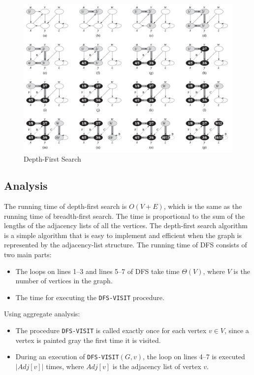 \begin{figure}[H]
    \centering
    \includegraphics[width=\textwidth]{assets/dfs.png}
    \caption{Depth-First Search}
    \label{fig:dfs}
\end{figure}

\subsection*{Analysis}

The running time of depth-first search is $O(V + E)$, which is the same as the running time of breadth-first search. The time is proportional to the sum of the lengths of the adjacency lists of all the vertices. The depth-first search algorithm is a simple algorithm that is easy to implement and efficient when the graph is represented by the adjacency-list structure.
The running time of DFS consists of two main parts:
\begin{itemize}
    \item The loops on lines 1--3 and lines 5--7 of DFS take time $\Theta(V)$, where $V$ is the number of vertices in the graph.
    \item The time for executing the \texttt{DFS-VISIT} procedure.
\end{itemize}

Using aggregate analysis:
\begin{itemize}
    \item The procedure \texttt{DFS-VISIT} is called exactly once for each vertex $v \in V$, since a vertex is painted gray the first time it is visited.
    \item During an execution of \texttt{DFS-VISIT}$(G, v)$, the loop on lines 4--7 is executed $|Adj[v]|$ times, where $Adj[v]$ is the adjacency list of vertex $v$.
\end{itemize}


